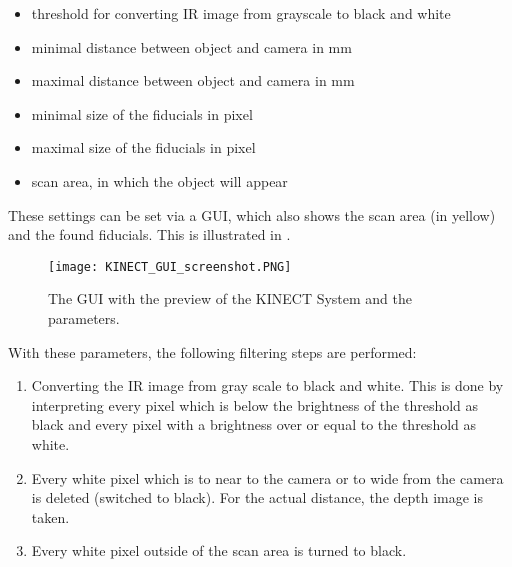 \begin{itemize}
\item threshold for converting IR image from grayscale to black and white
\item minimal distance between object and camera in mm
\item maximal distance between object and camera in mm
\item minimal size of the fiducials in pixel
\item maximal size of the fiducials in pixel
\item scan area, in which the object will appear 
\end{itemize}
These settings can be set via a GUI, which also shows the scan area (in yellow) and the found fiducials. This is illustrated in .
\begin{figure}[!t]
\centering
\texttt{[image: KINECT\_GUI\_screenshot.PNG]}
\caption{The GUI with the preview of the KINECT System and the parameters.}
\label{fig:KINECT_GUI_screenshot}
\end{figure}
With these parameters, the following filtering steps are performed:
\begin{enumerate}
\item Converting the IR image from gray scale to black and white. This is done by interpreting every pixel which is below the brightness of the threshold as black and every pixel with a brightness over or equal to the threshold as white.
\item Every white pixel which is to near to the camera or to wide from the camera is deleted (switched to black). For the actual distance, the depth image is taken. 
\item Every white pixel outside of the scan area is turned to black. 
\end{enumerate}

